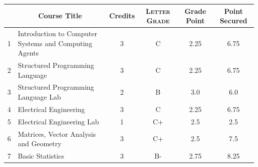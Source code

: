 \documentclass[11pt]{article}
\newcommand*{\numtwo}[1]{\pgfmathprintnumber[
                    fixed, precision=2, fixed zerofill=true]{#1}}
\begin{document}
                \begin{center}
                    \renewcommand{\arraystretch}{1.08}
                    
                \begin{tabular}{|c|l|c|>{\scshape}c|c|c|}
                \hline  \rule[-1ex]{0pt}{3.5ex} {\centering{\bf Course Code}} &  \multicolumn{1}{c|}{\textbf{Course Title}}  & {\bf Credits} & {\bf Letter Grade} & {\bf Grade Point} & {\bf Point Secured}  \\ 
                \hline   1 &  Introduction to Computer Systems and Computing Agents		 & 3 & C & 2.25 & 6.75 \\ %
                \hline   2 &  Structured Programming Language		 & 3 & C & 2.25 & 6.75 \\ %
                \hline   3 &  Structured Programming Language Lab		 & 2 & B & 3.0 & 6.0 \\ %
                \hline   4 &  Electrical Engineering		 & 3 & C & 2.25 & 6.75 \\ %
                \hline   5 &  Electrical Engineering Lab		 & 1 & C+ & 2.5 & 2.5 \\ %
                \hline   6 &  Matrices, Vector Analysis and Geometry		 & 3 & C+ & 2.5 & 7.5 \\ %
                \hline   7 &  Basic Statistics		 & 3 & B- & 2.75 & 8.25 \\ %

\hline                %
                \end{tabular}
                \end{center}
                \renewcommand{\arraystretch}{1.03}
\end{document}
